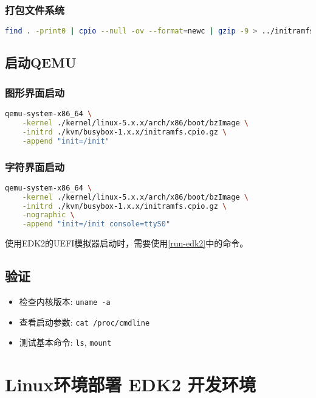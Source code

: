 \subsubsection{打包文件系统}
\begin{lstlisting}[language=bash]
find . -print0 | cpio --null -ov --format=newc | gzip -9 > ../initramfs.cpio.gz
\end{lstlisting}

\subsection{启动QEMU}
\subsubsection{图形界面启动}
\begin{lstlisting}[language=bash]
qemu-system-x86_64 \
    -kernel ./kernel/linux-5.x.x/arch/x86/boot/bzImage \
    -initrd ./kvm/busybox-1.x.x/initramfs.cpio.gz \
    -append "init=/init"
\end{lstlisting}

\subsubsection{字符界面启动}
\begin{lstlisting}[language=bash, showstringspaces=false]
qemu-system-x86_64 \
    -kernel ./kernel/linux-5.x.x/arch/x86/boot/bzImage \
    -initrd ./kvm/busybox-1.x.x/initramfs.cpio.gz \
    -nographic \
    -append "init=/init console=ttyS0"
\end{lstlisting}

使用EDK2的UEFI模拟器启动时，需要使用\ref{run-edk2}中的命令。

\subsection{验证}
\begin{itemize}
    \item 检查内核版本: \texttt{uname -a}
    \item 查看启动参数: \texttt{cat /proc/cmdline}
    \item 测试基本命令: \texttt{ls}, \texttt{mount}
\end{itemize}

\section{Linux环境部署 EDK2 开发环境}

